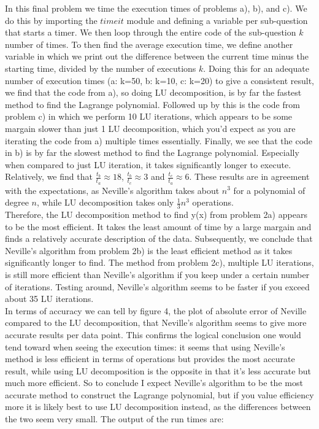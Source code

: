 In this final problem we time the execution times of problems a), b), and c). We do this by importing the $\textit{timeit}$ module and defining a variable per sub-question that starts a timer. We then loop through the entire code of the sub-question $k$ number of times. To then find the average execution time, we define another variable in which we print out the difference between the current time minus the starting time, divided by the number of executions $k$. Doing this for an adequate number of execution times (a: k=50, b: k=10, c: k=20) to give a consistent result, we find that the code from a), so doing LU decomposition, is by far the fastest method to find the Lagrange polynomial. Followed up by this is the code from problem c) in which we perform 10 LU iterations, which appears to be some margain slower than just 1 LU decomposition, which you'd expect as you are iterating the code from a) multiple times essentially. Finally, we see that the code in b) is by far the slowest method to find the Lagrange polynomial. Especially when compared to just LU iteration, it takes significantly longer to execute. Relatively, we find that $\frac{t_b}{t_a} \approx 18$, $\frac{t_b}{t_c} \approx 3$ and $\frac{t_c}{t_a} \approx 6$. These results are in agreement with the expectations, as Neville's algorithm takes about $n^3$ for a polynomial of degree $n$, while LU decomposition takes only $\frac{1}{3} n^3$ operations.\\

Therefore, the LU decomposition method to find y(x) from problem 2a) appears to be the most efficient. It takes the least amount of time by a large margain and finds a relatively accurate description of the data. Subsequently, we conclude that Neville's algorithm from problem 2b) is the least efficient method as it takes significantly longer to find. The method from problem 2c), multiple LU iterations, is still more efficient than Neville's algorithm if you keep under a certain number of iterations. Testing around, Neville's algorithm seems to be faster if you exceed about 35 LU iterations.\\

In terms of accuracy we can tell by figure 4, the plot of absolute error of Neville compared to the LU decomposition, that Neville's algorithm seems to give more accurate results per data point. This confirms the logical conclusion one would tend toward when seeing the execution times: it seems that using Neville's method is less efficient in terms of operations but provides the most accurate result, while using LU decomposition is the opposite in that it's less accurate but much more efficient. So to conclude I expect Neville's algorithm to be the most accurate method to construct the Lagrange polynomial, but if you value efficiency more it is likely best to use LU decomposition instead, as the differences between the two seem very small. The output of the run times are:\\

